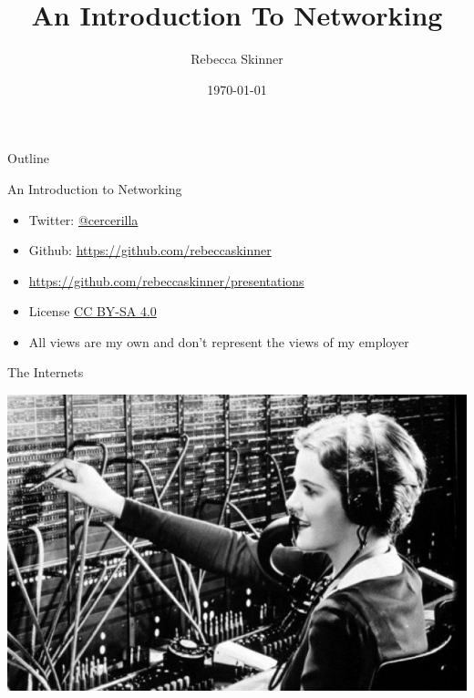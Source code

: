 \documentclass[presentation]{beamer}
\author{Rebecca Skinner}
\date{\today}
\title{An Introduction To Networking}
\begin{document}
\maketitle
\begin{frame}{Outline}
\tableofcontents
\end{frame}


\begin{frame}[label={sec:org6e32325}]{An Introduction to Networking}
\pause
\begin{itemize}
\item Twitter: \href{https://twitter.com/cercerilla/}{@cercerilla}
\end{itemize}
\pause
\begin{itemize}
\item Github: \url{https://github.com/rebeccaskinner}
\end{itemize}
\pause
\begin{itemize}
\item \url{https://github.com/rebeccaskinner/presentations}
\end{itemize}
\pause
\begin{itemize}
\item License \href{https://creativecommons.org/licenses/by-sa/4.0/}{CC BY-SA 4.0}
\item All views are my own and don't represent the views of my employer
\end{itemize}
\end{frame}

\begin{frame}[label={sec:orgde6d4f5}]{The Internets}
\begin{center}
\includegraphics[width=.9\linewidth]{./switch-operator.jpeg}
\end{center}
\end{frame}
\end{document}
